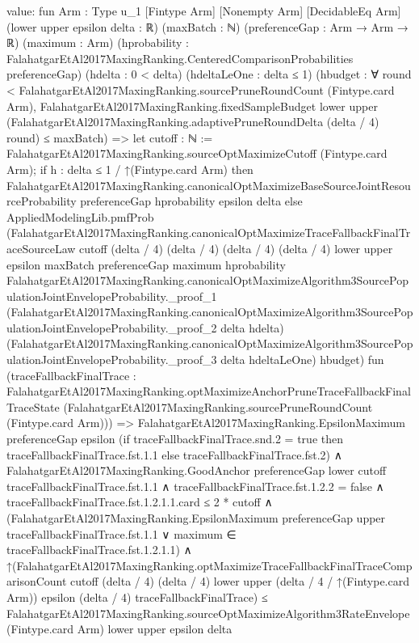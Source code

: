 \documentclass[10pt]{article}
\begin{document}
\begin{ReviewVerbatim}
value:
fun {Arm : Type u_1} [Fintype Arm] [Nonempty Arm] [DecidableEq Arm] (lower upper epsilon delta : ℝ) (maxBatch : ℕ)
    (preferenceGap : Arm → Arm → ℝ) (maximum : Arm)
    (hprobability : FalahatgarEtAl2017MaxingRanking.CenteredComparisonProbabilities preferenceGap) (hdelta : 0 < delta)
    (hdeltaLeOne : delta ≤ 1)
    (hbudget :
      ∀ round < FalahatgarEtAl2017MaxingRanking.sourcePruneRoundCount (Fintype.card Arm),
        FalahatgarEtAl2017MaxingRanking.fixedSampleBudget lower upper
            (FalahatgarEtAl2017MaxingRanking.adaptivePruneRoundDelta (delta / 4) round) ≤
          maxBatch) =>
  let cutoff : ℕ := FalahatgarEtAl2017MaxingRanking.sourceOptMaximizeCutoff (Fintype.card Arm);
  if h : delta ≤ 1 / ↑(Fintype.card Arm) then
    FalahatgarEtAl2017MaxingRanking.canonicalOptMaximizeBaseSourceJointResourceProbability preferenceGap hprobability
      epsilon delta
  else
    AppliedModelingLib.pmfProb
      (FalahatgarEtAl2017MaxingRanking.canonicalOptMaximizeTraceFallbackFinalTraceSourceLaw cutoff (delta / 4)
        (delta / 4) (delta / 4) (delta / 4) lower upper epsilon maxBatch preferenceGap maximum hprobability
        FalahatgarEtAl2017MaxingRanking.canonicalOptMaximizeAlgorithm3SourcePopulationJointEnvelopeProbability._proof_1
        (FalahatgarEtAl2017MaxingRanking.canonicalOptMaximizeAlgorithm3SourcePopulationJointEnvelopeProbability._proof_2
          delta hdelta)
        (FalahatgarEtAl2017MaxingRanking.canonicalOptMaximizeAlgorithm3SourcePopulationJointEnvelopeProbability._proof_3
          delta hdeltaLeOne)
        hbudget)
      fun
        (traceFallbackFinalTrace :
          FalahatgarEtAl2017MaxingRanking.optMaximizeAnchorPruneTraceFallbackFinalTraceState
            (FalahatgarEtAl2017MaxingRanking.sourcePruneRoundCount (Fintype.card Arm))) =>
      FalahatgarEtAl2017MaxingRanking.EpsilonMaximum preferenceGap epsilon
          (if traceFallbackFinalTrace.snd.2 = true then traceFallbackFinalTrace.fst.1.1
          else traceFallbackFinalTrace.fst.2) ∧
        FalahatgarEtAl2017MaxingRanking.GoodAnchor preferenceGap lower cutoff traceFallbackFinalTrace.fst.1.1 ∧
          traceFallbackFinalTrace.fst.1.2.2 = false ∧
            traceFallbackFinalTrace.fst.1.2.1.1.card ≤ 2 * cutoff ∧
              (FalahatgarEtAl2017MaxingRanking.EpsilonMaximum preferenceGap upper traceFallbackFinalTrace.fst.1.1 ∨
                  maximum ∈ traceFallbackFinalTrace.fst.1.2.1.1) ∧
                ↑(FalahatgarEtAl2017MaxingRanking.optMaximizeTraceFallbackFinalTraceComparisonCount cutoff (delta / 4)
                      (delta / 4) lower upper (delta / 4 / ↑(Fintype.card Arm)) epsilon (delta / 4)
                      traceFallbackFinalTrace) ≤
                  FalahatgarEtAl2017MaxingRanking.sourceOptMaximizeAlgorithm3RateEnvelope (Fintype.card Arm) lower upper
                    epsilon delta
\end{ReviewVerbatim}
\end{document}
